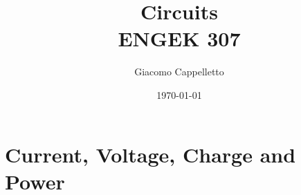 \documentclass{report}
\title{\Huge{Circuits}\\ENGEK 307}
\author{\huge{Giacomo Cappelletto}}
\date{\today}
\begin{document}
\maketitle
\newpage
{}
\tableofcontents
\pagebreak

\chapter{Current, Voltage, Charge and Power}
\end{document}
